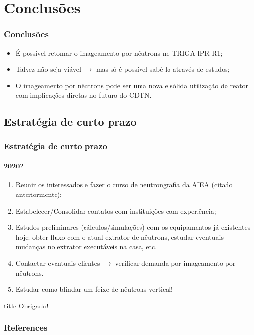 \documentclass[svgnames,smaller,table]{beamer}
\begin{document}
\section{Conclusões}
\begin{frame}[fragile] %
  \frametitle{Conclusões}
  \begin{itemize}
  \item É possível retomar o imageamento por nêutrons no TRIGA IPR-R1;
  \item Talvez não seja viável $\rightarrow$ mas só é possível sabê-lo através de estudos;
  \item O imageamento por nêutrons pode ser uma nova e sólida utilização do reator com implicações diretas no futuro do CDTN.
  \end{itemize}
\end{frame}

\subsection{Estratégia de curto prazo}
\begin{frame}
  \frametitle{Estratégia de curto prazo}
  \framesubtitle{2020?}
  \begin{enumerate}
  \item Reunir os interessados e fazer o curso de neutrongrafia da AIEA (citado anteriormente);
  \item Estabelecer/Consolidar contatos com instituições com experiência;
  \item Estudos preliminares (cálculos/simulações) com os equipamentos já existentes hoje: obter fluxo com o atual extrator de nêutrons, estudar eventuais mudanças no extrator executáveis na casa, etc.
  \item Contactar eventuais clientes $\rightarrow$ verificar demanda por imageamento por nêutrons.
  \item \alert{Estudar como blindar um feixe de nêutrons vertical!} \pause \cite{Wilson2017}
  \end{enumerate}
\end{frame}



\begin{frame}
 \vfill
  \begin{beamercolorbox}[center]{title}
     \Huge{Obrigado!}
  \end{beamercolorbox}
  \vfill
\end{frame}

\begin{frame}
    \frametitle{References}
    
%    
    
\end{frame}
\end{document}
